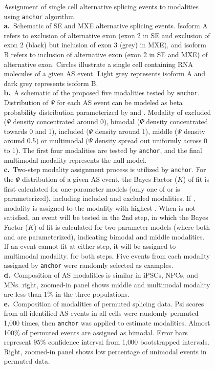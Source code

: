 \clearpage
\thispagestyle{facingcaption}
\begin{figure}[h]
\captionsetup{labelformat=prev-page}
\caption[Assignment of single cell alternative splicing events to modalities using \texttt{anchor} algorithm.]{
Assignment of single cell alternative splicing events to modalities using \texttt{anchor} algorithm.\\
\textbf{a.}~Schematic of SE and MXE alternative splicing events. Isoform A refers to exclusion of alternative exon (exon 2 in SE and exclusion of exon 2 (black) but inclusion of exon 3 (grey) in MXE), and isoform B refers to inclusion of alternative exon (exon 2 in SE and MXE) of alternative exon. Circles illustrate a single cell containing RNA molecules of a given AS event. Light grey represents isoform A and dark grey represents isoform B. \\
\textbf{b.}~A schematic of the proposed five modalities tested by \texttt{anchor}. Distribution of $\Psi$ for each AS event can be modeled as beta probability distribution parameterized by  and . Modality of excluded ($\Psi$ density concentrated around 0), bimodal ($\Psi$ density concentrated towards 0 and 1), included ($\Psi$ density around 1), middle ($\Psi$ density around 0.5) or multimodal ($\Psi$ density spread out uniformly across 0 to 1). The first four modalities are tested by \texttt{anchor}, and the final multimodal modality represents the null model. \\
\textbf{c.}~Two-step modality assignment process is utilized by \texttt{anchor}. For the $\Psi$ distribution of a given AS event, the Bayes Factor ($K$) of fit is first calculated for one-parameter models (only one of  or is parameterized), including included and excluded modalities. If , modality is assigned to the modality with highest . When is not satisfied, an event will be tested in the 2nd step, in which the Bayes Factor ($K$) of fit is calculated for two-parameter models (where both  and are parameterized), indicating bimodal and middle modalities. If an event cannot fit at either step, it will be assigned to multimodal modality.  for both steps. Five events from each modality assigned by \texttt{anchor} were randomly selected as examples.
\textbf{d.}~Composition of AS modalities is similar in iPSCs, NPCs, and MNs. right, zoomed-in panel shows middle and multimodal modality are less than 1\% in the three populations.\\
\textbf{e.}~Composition of modalities of permuted splicing data. Psi scores from all identified AS events in all cells were randomly permuted 1,000 times, then \texttt{anchor} was applied to estimate modalities. Almost 100\% of permuted events are assigned as bimodal. Error bars represent 95\% confidence interval from 1,000 bootstrapped intervals. Right, zoomed-in panel shows low percentage of unimodal events in permuted data.
}
\label{fig:anchor_overview}
\end{figure}
